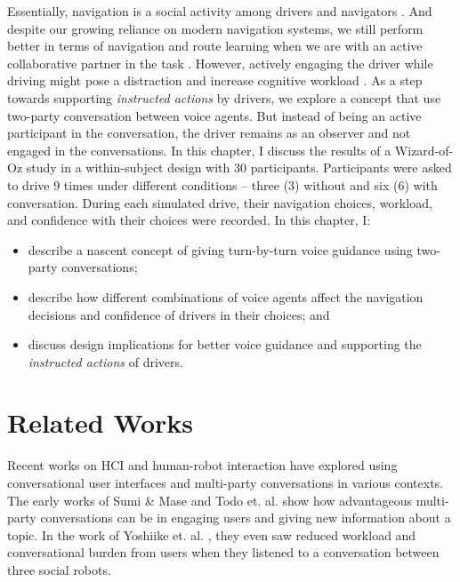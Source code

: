 Essentially, navigation is a social activity among drivers and navigators \cite{Forlizzi2010WhereTurn, Matsumura2014WhatDriving}. And despite our growing reliance on modern navigation systems, we still perform better in terms of navigation and route learning when we are with an active collaborative partner in the task \cite{Antrobus2017Driver-PassengerSystems, antrobus_large_burnett_hare_2019, Brown2012TheGPS}. However, actively engaging the driver while driving might pose a distraction and increase cognitive workload \cite{Karatas2018}. As a step towards supporting \textit{instructed actions} by drivers, we explore a concept that use two-party conversation between voice agents. But instead of being an active participant in the conversation, the driver remains as an observer and not engaged in the conversations. In this chapter, I discuss the results of a Wizard-of-Oz study in a within-subject design with 30 participants. Participants were asked to drive 9 times under different conditions -- three (3) without and six (6) with conversation. During each simulated drive, their navigation choices, workload, and confidence with their choices were recorded. In this chapter, I:
\begin{itemize}
    \item describe a nascent concept of giving turn-by-turn voice guidance using two-party conversations;
    \item describe how different combinations of voice agents affect the navigation decisions and confidence of drivers in their choices; and
    \item discuss design implications for better voice guidance and supporting the \textit{instructed actions} of drivers.
\end{itemize}

\section{Related Works}
Recent works on HCI and human-robot interaction have explored using conversational user interfaces and multi-party conversations in various contexts. The early works of Sumi \& Mase \cite{Sumi:2001:AFF:375735.376344} and Todo et. al. \cite{Todo2013} show how advantageous multi-party conversations can be in engaging users and giving new information about a topic. In the work of Yoshiike et. al. \cite{Yoshiike:2011:MSI:2177868.2177871}, they even saw reduced workload and conversational burden from users when they listened to a conversation between three social robots. 

